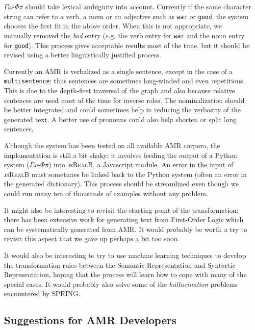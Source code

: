 \documentclass[12pt]{article}
\newcommand{\systeme}[1]{\textsc{#1}}
\newcommand{\jsr}{\systeme{jsRealB}}
\newcommand{\gophipy}{$\Gamma\omega$-$\Phi\pi$}
\newcommand{\spring}{\systeme{SPRING}}
\newcommand{\representation}[1]{\textsf{#1}}
\newcommand{\AMR}{\representation{AMR}}
\newcommand{\fol}{\representation{First-Order Logic}}
\newcommand{\semr}{\representation{Semantic Representation}}
\newcommand{\syntr}{\representation{Syntactic Representation}}
\begin{document}
\gophipy{} should take lexical ambiguity into account. Currently if the same character string can refer to a verb, a noun or an adjective such as \texttt{war} or \texttt{good}, the system chooses the first fit in the above order. When this is not appropriate, we manually removed the \emph{bad} entry (e.g. the verb entry for \texttt{war} and the noun entry for \texttt{good}). This process gives acceptable results most of the time, but it should be revised using a better linguistically justified process.

Currently an \AMR{} is verbalized as a single sentence, except in the case of a \texttt{multisentence}; thus sentences are sometimes long-winded and even repetitious. This is due to the depth-first traversal of the graph and also because relative sentences are used most of the time for inverse roles.  The nominalization should be better integrated and could sometimes help in reducing the verbosity of the generated text. A better use of pronouns could also help shorten or split long sentences.

Although the system has been tested on all available \AMR{} corpora, the implementation is still a bit shaky: it involves feeding the output of a Python system (\gophipy{}) into \jsr{}, a Javascript module. An error in the input of \jsr{} must sometimes be linked back to the Python system (often an error in the generated dictionary).
This process should be streamlined even though we could run many ten of thousands of examples without any problem.

It might also be interesting to revisit the starting point of the transformation: there has been extensive work for generating text from \fol{} which can be systematically generated from \AMR{}. It would probably be worth a try to revisit this aspect that we gave up perhaps a bit too soon.

It would also be interesting to try to use machine learning techniques to develop the transformation rules between the \semr{} and \syntr{}, hoping that the process will learn how to cope with many of the special cases. It would probably also solve some of the \emph{hallucination} problems encountered by \spring{}.

\subsection{Suggestions for \AMR{} Developers} %
\label{sub:suggestions_for_amr_developers}
\end{document}
